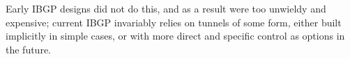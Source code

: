 Early IBGP designs did not do this, and as a result were too unwieldy and expensive; current IBGP invariably relies on tunnels of some form, either built implicitly in simple cases, or with more direct and specific control as options in the future.












